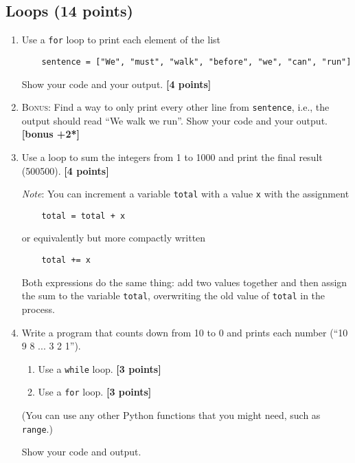 \documentclass[letterpaper]{scrartcl}
\newcommand{\BONUS}{\textsc{Bonus: }}
\newcommand{\bonus}[1]{\textbf{[bonus +#1*]}}
\newcommand{\points}[1]{\textbf{[#1 points]}}
\newenvironment{enuma}{\begin{enumerate}[label=(\alph*)]}{\end{enumerate}}
\newenvironment{enumi}{\begin{enumerate}[label=(\roman*)]}{\end{enumerate}}
\newcommand{\python}[1]{\texttt{#1}}
\begin{document}
\subsection{Loops (14 points)}
\begin{enuma}
\item Use a \python{for} loop to print each element of the list
  \begin{verbatim}
    sentence = ["We", "must", "walk", "before", "we", "can", "run"]
  \end{verbatim}
  Show your code and your output. \points{4}
\item \BONUS Find a way to only print every other line from
  \python{sentence}, i.e., the output should read ``We walk we
  run''. Show your code and your output. \bonus{2}
\item Use a loop to sum the integers from 1 to 1000 and print the
  final result (500500). \points{4}

  \noindent\emph{Note}: You can increment a variable \python{total}
  with a value \python{x} with the assignment
  \begin{verbatim}
    total = total + x
  \end{verbatim}
  or equivalently but more compactly written
  \begin{verbatim}
    total += x
  \end{verbatim}
  Both expressions do the same thing: add two values together and then
  assign the sum to the variable \python{total}, overwriting the old
  value of \python{total} in the process.
\item Write a program that counts down from 10 to 0 and prints each
  number (``10 9 8 ... 3 2 1'').
  \begin{enumi}    
  \item Use a \python{while} loop. \points{3}
  \item Use a \python{for} loop. \points{3}
  \end{enumi}
  (You can use any other Python functions that you might need, such as
  \python{range}.)

  Show your code and output.
\end{enuma}



\end{document}

